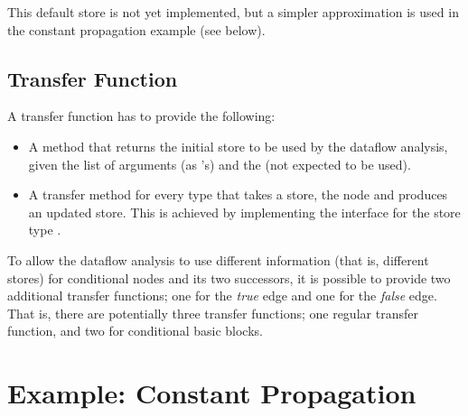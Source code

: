 \begin{workinprogress}
    This default store is not yet implemented, but a simpler approximation is used in the
    constant propagation example (see below).
\end{workinprogress}



\subsection{Transfer Function}

A transfer function has to provide the following:
\begin{itemize}
\item A method that returns the initial store to be used by the dataflow analysis, given
the list of arguments (as 's) and the  (not expected to be used).
\item A transfer method for every  type that takes a store, the node and produces
an updated store. This is achieved by implementing the  interface
for the store type .
\end{itemize}

To allow the dataflow analysis to use different information (that is, different stores)
for conditional nodes and its two successors, it is possible to provide two additional
transfer functions; one for the \emph{true} edge and one for the \emph{false} edge.
That is, there are potentially three transfer functions; one regular transfer function, and two
for conditional basic blocks.


\section{Example: Constant Propagation}

